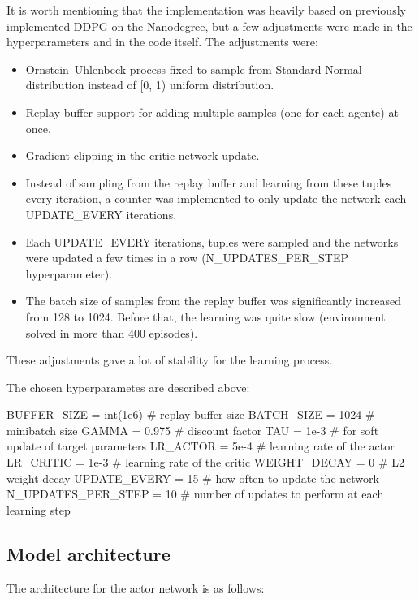 \documentclass{article}
\begin{document}
It is worth mentioning that the implementation was heavily based on previously implemented DDPG on the Nanodegree, but a few adjustments were made in the hyperparameters and in the code itself. The adjustments were:

\begin{itemize}
    \item Ornstein–Uhlenbeck process fixed to sample from Standard Normal distribution instead of [0, 1) uniform distribution.
    \item Replay buffer support for adding multiple samples (one for each agente) at once.
    \item Gradient clipping in the critic network update.
    \item Instead of sampling from the replay buffer and learning from these tuples every iteration, a counter was implemented to only update the network each UPDATE\_EVERY iterations.
    \item Each UPDATE\_EVERY iterations, tuples were sampled and the networks were updated a few times in a row (N\_UPDATES\_PER\_STEP hyperparameter).
    \item The batch size of samples from the replay buffer was significantly increased from 128 to 1024. Before that, the learning was quite slow (environment solved in more than 400 episodes).
\end{itemize}

These adjustments gave a lot of stability for the learning process.

The chosen hyperparametes are described above:

\begin{code}[Python]
BUFFER_SIZE = int(1e6)    # replay buffer size
BATCH_SIZE = 1024         # minibatch size
GAMMA = 0.975             # discount factor
TAU = 1e-3                # for soft update of target parameters
LR_ACTOR = 5e-4           # learning rate of the actor 
LR_CRITIC = 1e-3          # learning rate of the critic
WEIGHT_DECAY = 0          # L2 weight decay
UPDATE_EVERY = 15         # how often to update the network
N_UPDATES_PER_STEP = 10   # number of updates to perform at each learning step
\end{code}

\subsection{Model architecture}

The architecture for the actor network is as follows:
\end{document}
